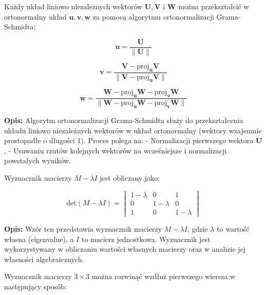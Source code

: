 \vspace{1em}
\noindent
Każdy układ liniowo niezależnych wektorów \( \mathbf{U}, \mathbf{V} \) i \( \mathbf{W} \) można przekształcić w ortonormalny układ \( \mathbf{u}, \mathbf{v}, \mathbf{w} \) za pomocą algorytmu ortonormalizacji Grama-Schmidta:

\[
\mathbf{u} = \frac{\mathbf{U}}{\|\mathbf{U}\|}
\]

\[
\mathbf{v} = \frac{\mathbf{V} - \text{proj}_{\mathbf{u}} \mathbf{V}}{\|\mathbf{V} - \text{proj}_{\mathbf{u}} \mathbf{V}\|}
\]

\[
\mathbf{w} = \frac{\mathbf{W} - \text{proj}_{\mathbf{u}} \mathbf{W} - \text{proj}_{\mathbf{v}} \mathbf{W}}{\|\mathbf{W} - \text{proj}_{\mathbf{u}} \mathbf{W} - \text{proj}_{\mathbf{v}} \mathbf{W}\|}
\]

\vspace{1em}
\noindent
\textbf{Opis:} Algorytm ortonormalizacji Grama-Schmidta służy do przekształcenia układu liniowo niezależnych wektorów w układ ortonormalny (wektory wzajemnie prostopadłe o długości 1). Proces polega na:
- Normalizacji pierwszego wektora \( \mathbf{U} \),
- Usuwaniu rzutów kolejnych wektorów na wcześniejsze i normalizacji powstałych wyników.



\vspace{1em}
\noindent
Wyznacznik macierzy \( M - \lambda I \) jest obliczany jako:

\[
\text{det}(M - \lambda I) = 
\begin{vmatrix}
1 - \lambda & 0 & 1 \\
0 & 1 - \lambda & 0 \\
1 & 0 & 1 - \lambda
\end{vmatrix}
\]

\vspace{1em}
\noindent
\textbf{Opis:} Wzór ten przedstawia wyznacznik macierzy \( M - \lambda I \), gdzie \( \lambda \) to wartość własna (eigenvalue), a \( I \) to macierz jednostkowa. Wyznacznik jest wykorzystywany w obliczaniu wartości własnych macierzy oraz w analizie jej własności algebraicznych.



\vspace{1em}
\noindent
Wyznacznik macierzy \( 3 \times 3 \) można rozwinąć wzdłuż pierwszego wiersza w następujący sposób:

